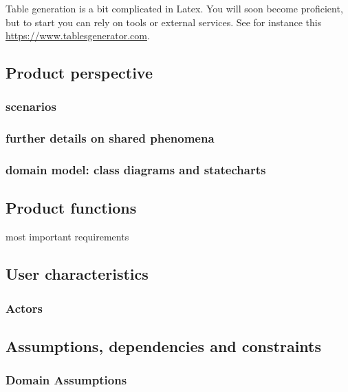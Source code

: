 Table generation is a bit complicated in Latex. You will soon become proficient, but to start you can rely on tools or external services. See for instance this \href{https://www.tablesgenerator.com}{https://www.tablesgenerator.com}. 

\subsection{Product perspective}
\subsubsection{scenarios}
\subsubsection{further details on shared phenomena}
\subsubsection{domain model: class diagrams and statecharts}
\subsection{Product functions}
most important requirements
\subsection{User characteristics}
\subsubsection{Actors}
\subsection{Assumptions, dependencies and constraints}
\subsubsection{Domain Assumptions}

